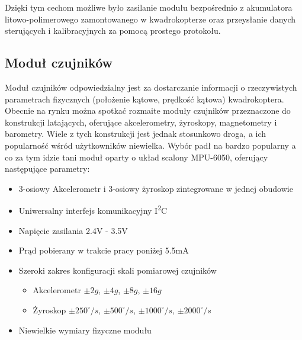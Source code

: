 Dzięki tym cechom możliwe było zasilanie modułu bezpośrednio z akumulatora litowo-polimerowego zamontowanego w kwadrokopterze oraz przeysłanie danych sterujących i kalibracyjnych za pomocą prostego protokołu.

\subsection{Moduł czujników}
Moduł czujników odpowiedzialny jest za dostarczanie informacji o rzeczywistych parametrach fizycznych (położenie kątowe, prędkość kątowa) kwadrokoptera. Obecnie na rynku można spotkać rozmaite moduły czujników przeznaczone do konstrukcji latających, oferujące akcelerometry, żyroskopy, magnetometry i barometry. Wiele z tych konstrukcji jest jednak stosunkowo droga, a ich popularność wśród użytkowników niewielka. Wybór padł na bardzo popularny a co za tym idzie tani moduł oparty o układ scalony MPU-6050, oferujący następujące parametry:

\begin{itemize}
	\item 3-osiowy Akcelerometr i 3-osiowy żyroskop zintegrowane w jednej obudowie
	\item Uniwersalny interfejs komunikacyjny I\textsuperscript{2}C
	\item Napięcie zasilania 2.4V - 3.5V
	\item Prąd pobierany w trakcie pracy poniżej 5.5mA
	\item Szeroki zakres konfiguracji skali pomiarowej czujników
		\begin{itemize}
			\item Akcelerometr $\pm 2g$, $\pm 4g$, $\pm 8g$, $\pm 16g$
			\item Żyroskop $\pm 250^{\circ}/s$, $\pm 500^{\circ}/s$, $\pm 1000^{\circ}/s$, $\pm 2000^{\circ}/s$
		\end{itemize}
	\item Niewielkie wymiary fizyczne modułu
\end{itemize}

